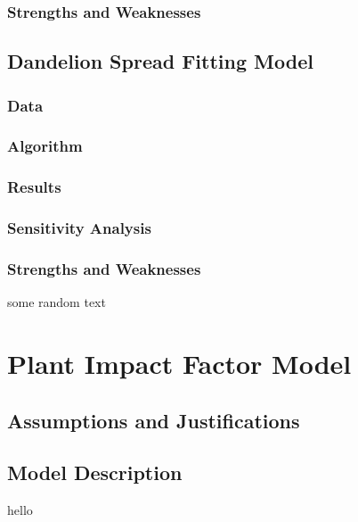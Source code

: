 \documentclass[12pt]{article}
\begin{document}
		\subsubsection{Strengths and Weaknesses}
		
	\subsection{Dandelion Spread Fitting Model}
		
		\subsubsection{Data}
		
		\subsubsection{Algorithm}
		
		\subsubsection{Results}
		
		\subsubsection{Sensitivity Analysis}
		
		\subsubsection{Strengths and Weaknesses}
	
			some random text
		
\section{Plant Impact Factor Model}

	\subsection{Assumptions and Justifications}
	
	\subsection{Model Description}

		hello
		
\end{document}
